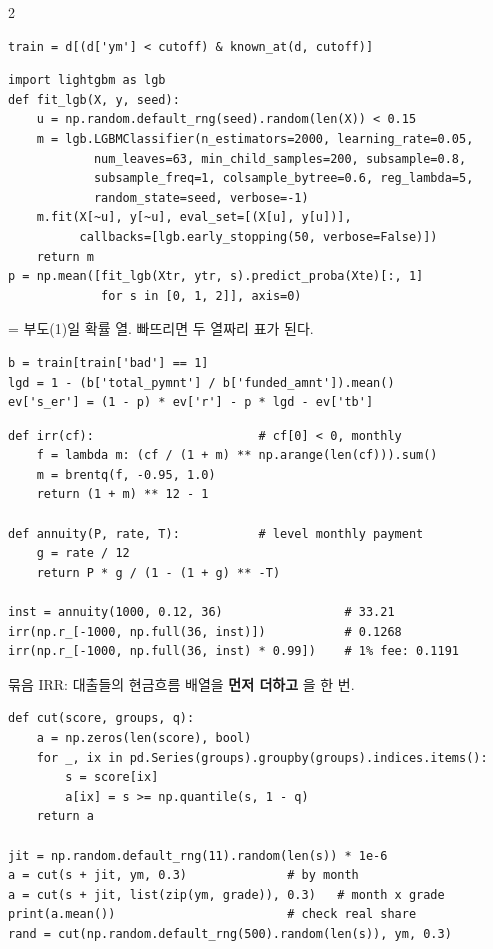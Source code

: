 \begin{multicols}{2}
\begin{lstlisting}
train = d[(d['ym'] < cutoff) & known_at(d, cutoff)]
\end{lstlisting}

\begin{lstlisting}
import lightgbm as lgb
def fit_lgb(X, y, seed):
    u = np.random.default_rng(seed).random(len(X)) < 0.15
    m = lgb.LGBMClassifier(n_estimators=2000, learning_rate=0.05,
            num_leaves=63, min_child_samples=200, subsample=0.8,
            subsample_freq=1, colsample_bytree=0.6, reg_lambda=5,
            random_state=seed, verbose=-1)
    m.fit(X[~u], y[~u], eval_set=[(X[u], y[u])],
          callbacks=[lgb.early_stopping(50, verbose=False)])
    return m
p = np.mean([fit_lgb(Xtr, ytr, s).predict_proba(Xte)[:, 1]
             for s in [0, 1, 2]], axis=0)
\end{lstlisting}
\ft{[:, 1]} = 부도(1)일 확률 열. 빠뜨리면 두 열짜리 표가 된다.

\begin{lstlisting}
b = train[train['bad'] == 1]
lgd = 1 - (b['total_pymnt'] / b['funded_amnt']).mean()
ev['s_er'] = (1 - p) * ev['r'] - p * lgd - ev['tb']
\end{lstlisting}

\begin{lstlisting}
def irr(cf):                       # cf[0] < 0, monthly
    f = lambda m: (cf / (1 + m) ** np.arange(len(cf))).sum()
    m = brentq(f, -0.95, 1.0)
    return (1 + m) ** 12 - 1

def annuity(P, rate, T):           # level monthly payment
    g = rate / 12
    return P * g / (1 - (1 + g) ** -T)

inst = annuity(1000, 0.12, 36)                 # 33.21
irr(np.r_[-1000, np.full(36, inst)])           # 0.1268
irr(np.r_[-1000, np.full(36, inst) * 0.99])    # 1% fee: 0.1191
\end{lstlisting}
묶음 IRR: 대출들의 현금흐름 배열을 \textbf{먼저 더하고} 을 한 번.

\begin{lstlisting}
def cut(score, groups, q):
    a = np.zeros(len(score), bool)
    for _, ix in pd.Series(groups).groupby(groups).indices.items():
        s = score[ix]
        a[ix] = s >= np.quantile(s, 1 - q)
    return a

jit = np.random.default_rng(11).random(len(s)) * 1e-6
a = cut(s + jit, ym, 0.3)              # by month
a = cut(s + jit, list(zip(ym, grade)), 0.3)   # month x grade
print(a.mean())                        # check real share
rand = cut(np.random.default_rng(500).random(len(s)), ym, 0.3)
\end{lstlisting}


\end{multicols}
